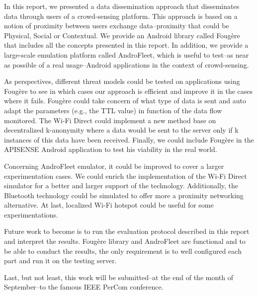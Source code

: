 

In this report, we presented a data dissemination approach that disseminates data through users of a crowd-sensing platform.
This approach is based on a notion of proximity between users exchange data--proximity that could be Physical, Social or Contextual.
We provide an Android library called Foug\`ere that includes all the concepts presented in this report. 
In addition, we provide a large-scale emulation platform called AndroFleet, which is useful to test--as near as possible of a real usage--Android applications in the context of crowd-sensing.


As perspectives, different threat models could be tested on applications using Foug\`ere to see in which cases our approach is efficient and improve it in the cases where it fails.
Foug\`ere could take concern of what type of data is sent and auto adapt the parameters (e.g., the TTL value) in function of the data flow monitored.
The Wi-Fi Direct could implement a new method base on decentralized k-anonymity where a data would be sent to the server only if k instances of this data have been received.
Finally, we could include Foug\`ere in the APISENSE Android application to test his viability in the real world.

Concerning AndroFleet emulator, it could be improved to cover a larger experimentation cases.
We could enrich the implementation of the Wi-Fi Direct simulator for a better and larger support of the technology.
Additionally, the Bluetooth technology could be simulated to offer more a proximity networking alternative.
At last, localized Wi-Fi hotspot could be useful for some experimentations.


Future work to become is to run the evaluation protocol described in this report and interpret the results.
Foug\`ere library and AndroFleet are functional and to be able to conduct the results, the only requirement is to well configured each part and run it on the testing server.

Last, but not least, this work will be submitted--at the end of the month of September--to the famous IEEE PerCom conference. 

